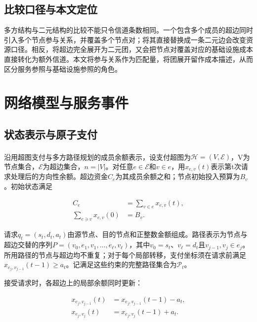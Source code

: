 \documentclass[UTF8,a4paper,twocolumn,fontset=none,zihao=5]{ctexart}
\newcommand{\upcite}[1]{\textsuperscript{\cite{#1}}}
\begin{document}
\subsection{比较口径与本文定位}

多方结构与二元结构的比较不能只令信道条数相同。一个包含多个成员的超边同时引入多个节点参与关系，并覆盖多个节点对；将其直接替换成一条二元边会改变资源口径。相反，将超边完全展开为二元团，又会把节点对覆盖对应的基础设施成本直接转化为额外信道。本文将参与关系作为匹配量，将团展开留作成本描述，从而区分服务参照与基础设施参照的角色。


\section{网络模型与服务事件}

\subsection{状态表示与原子支付}

沿用超图支付与多方路径规划的成员余额表示\upcite{r10,r11}，设支付超图为$\mathcal H=(V,\mathcal E)$，V为节点集合，$\mathcal E$为超边集合，$n=|V|$。对任意$e\in\mathcal E$和$v\in e$，用$x_{e,v}(t)$表示第t次请求处理后的方向性余额。超边资金$C_e$为其成员余额之和；节点初始投入预算为$B_v$。初始状态满足



\begin{equation}
\begin{aligned} C_e&=\sum_{v\in e}x_{e,v}(t),\\ \sum_{e\ni v}x_{e,v}(0)&=B_v.\end{aligned}
\label{eq:1}\end{equation}


请求$q_t=(s_t,d_t,a_t)$由源节点、目的节点和正整数金额组成。路径表示为节点与超边交替的序列$P=(v_0,e_1,v_1,\ldots,e_\ell,v_\ell)$，其中$v_0=s_t$、$v_\ell=d_t$且$v_{j-1},v_j\in e_j$。所用路径的节点与超边均不重复；对于每个局部转移，支付坐标须在请求前满足$x_{e_j,v_{j-1}}(t-1)\geq a_t$。记满足这些约束的完整路径集合为$\mathcal P_t$。


接受请求时，各超边上的局部余额同时更新：



\begin{equation}
\begin{aligned}x_{e_j,v_{j-1}}(t)&=x_{e_j,v_{j-1}}(t-1)-a_t,\\x_{e_j,v_j}(t)&=x_{e_j,v_j}(t-1)+a_t.\end{aligned}
\label{eq:2}\end{equation}
\end{document}
